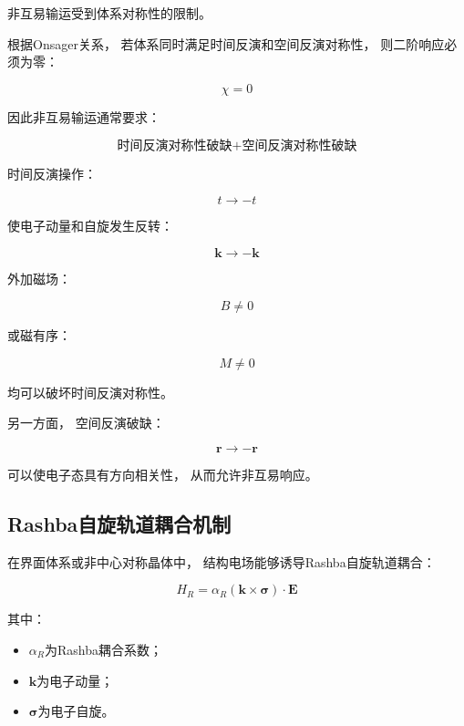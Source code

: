 \documentclass[10.5pt]{article}
\begin{document}
非互易输运受到体系对称性的限制。

根据Onsager关系，
若体系同时满足时间反演和空间反演对称性，
则二阶响应必须为零：

\begin{equation}
\chi=0
\end{equation}


因此非互易输运通常要求：

\begin{equation}
\boxed{
\text{时间反演对称性破缺}
+
\text{空间反演对称性破缺}
}
\end{equation}


时间反演操作：

\begin{equation}
t\rightarrow -t
\end{equation}


使电子动量和自旋发生反转：

\begin{equation}
\bm{k}\rightarrow-\bm{k}
\end{equation}


外加磁场：

\begin{equation}
B\neq0
\end{equation}

或磁有序：

\begin{equation}
M\neq0
\end{equation}

均可以破坏时间反演对称性。


另一方面，
空间反演破缺：

\begin{equation}
\bm{r}\rightarrow-\bm{r}
\end{equation}

可以使电子态具有方向相关性，
从而允许非互易响应。



\subsection{Rashba自旋轨道耦合机制}

在界面体系或非中心对称晶体中，
结构电场能够诱导Rashba自旋轨道耦合：

\begin{equation}
H_R=
\alpha_R
(\bm{k}\times\bm{\sigma})
\cdot
\bm{E}
\end{equation}


其中：

\begin{itemize}
\item $\alpha_R$为Rashba耦合系数；
\item $\bm{k}$为电子动量；
\item $\bm{\sigma}$为电子自旋。
\end{itemize}
\end{document}
